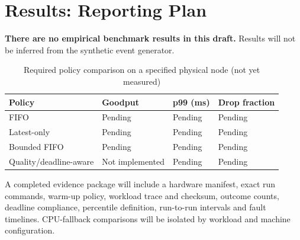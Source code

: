 \section{Results: Reporting Plan}
\textbf{There are no empirical benchmark results in this draft.} Results will not be inferred from the synthetic event generator.

\begin{table}[htbp]
\caption{Required policy comparison on a specified physical node (not yet measured)}
\centering
\begin{tabular}{llll}
\toprule
Policy & Goodput & p99 (ms) & Drop fraction\\
\midrule
FIFO & Pending & Pending & Pending\\
Latest-only & Pending & Pending & Pending\\
Bounded FIFO & Pending & Pending & Pending\\
Quality/deadline-aware & Not implemented & Pending & Pending\\
\bottomrule
\end{tabular}
\end{table}

A completed evidence package will include a hardware manifest, exact run commands, warm-up policy, workload trace and checksum, outcome counts, deadline compliance, percentile definition, run-to-run intervals and fault timelines. CPU-fallback comparisons will be isolated by workload and machine configuration.
